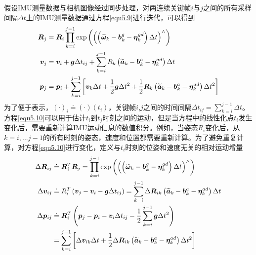 假设IMU测量数据与相机图像经过同步处理，对两连续关键帧$i$与$j$之间的所有采样间隔$\Delta t$上的IMU测量数据通过方程\eqref{equ5.9}进行迭代，可以得到
\begin{equation}
\label{equ5.10}
\begin{aligned}
\boldsymbol{R}_j &= \boldsymbol{R}_i \prod\limits_{k=i}^{j-1}\exp \left( \left( \left( \widetilde{\boldsymbol{\omega}}_k - \boldsymbol{b}_k^g-\boldsymbol{\eta}_k^{gd} \right) \Delta t \right)^{\wedge} \right) 
\\ 
\boldsymbol{v}_j &= \boldsymbol{v}_i+\boldsymbol{g} \Delta t_{ij} +  \sum\limits_{k=i}^{j-1}R_k \left( \widetilde{\boldsymbol{a}}_k - \boldsymbol{b}_k^a -\boldsymbol{\eta}_k^{ad} \right)\Delta t
\\
\boldsymbol{p}_j &= \boldsymbol{p}_i + \sum\limits_{k=i}^{j-1} \left[ \boldsymbol{v}_k \Delta t + {1 \over 2}\boldsymbol{g}\Delta t^2 + {1 \over 2}\boldsymbol{R}_k \left( \widetilde{\boldsymbol{a}}_k - \boldsymbol{b}_k^a -\boldsymbol{\eta}_k^{ad} \right)\Delta t^2 \right]
\end{aligned}
\end{equation}
为了便于表示，$(\cdot)_i \doteq (\cdot)(t_i)$，关键帧$i$,$j$之间的时间间隔$\Delta t_{ij} = \sum_{k=i}^{j-1}\Delta t$。方程\eqref{equ5.10}可以用于估计$t_i$到$t_j$时刻之间的运动，但是当方程中的线性化点$t_i$发生变化后，需要重新计算IMU运动信息的数值积分。例如，当姿态$R_i$变化后，从$k=i,...j-1$的所有时刻的姿态，速度和位置都需要重新计算。为了避免重复计算，对方程\eqref{equ5.10}进行变化，定义与$t_i$时刻的位姿和速度无关的相对运动增量
\begin{equation}
\label{equ5.11}
\begin{aligned}
\Delta \boldsymbol{R}_{ij} &\doteq \boldsymbol{R}_i^T \boldsymbol{R}_j = \prod\limits_{k=i}^{j-1}\exp \left( \left( \left( \widetilde{\boldsymbol{\omega}}_k - \boldsymbol{b}_k^g-\boldsymbol{\eta}_k^{gd} \right) \Delta t  \right)^{\wedge} \right) 
\\ 
\Delta \boldsymbol{v}_{ij} &\doteq R_i^T\left( \boldsymbol{v}_j-\boldsymbol{v}_i-\boldsymbol{g}\Delta t_{ij}\right) =  \sum\limits_{k=i}^{j-1} \Delta \boldsymbol{R}_{ik} \left( \widetilde{\boldsymbol{a}}_k - \boldsymbol{b}_k^a -\boldsymbol{\eta}_k^{ad} \right)\Delta t
\\ 
\Delta \boldsymbol{p}_{ij} &\doteq \boldsymbol{R}_i^T \left( \boldsymbol{p}_j-\boldsymbol{p}_i-\boldsymbol{v}_i\Delta  t_{ij} - {1 \over 2} \sum\limits_{k=i}^{j-1} \boldsymbol{g} \Delta t^2 \right) \\
&=  \sum\limits_{k=i}^{j-1} \left[ \Delta \boldsymbol{v}_{ik} \Delta t + {1 \over 2}\Delta \boldsymbol{R}_{ik} \left( \widetilde{\boldsymbol{a}}_k - \boldsymbol{b}_k^a -\boldsymbol{\eta}_k^{ad} \right)\Delta t^2 \right]
\end{aligned}
\end{equation}
